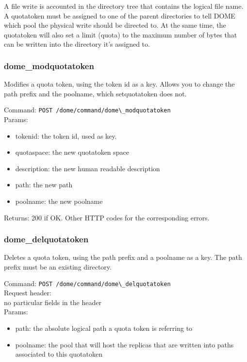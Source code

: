 \documentclass[a4paper,10pt]{scrreprt}
\begin{document}
A file write is accounted in the directory tree that contains the logical file name. A quotatoken must be assigned to one of the parent directories to tell DOME which pool the physical write should be directed to.
At the same time, the quotatoken will also set a limit (quota) to the maximum number of bytes that can be written into the directory it's assigned to.

\subsubsection{dome\_modquotatoken}
Modifies a quota token, using the token id as a key. Allows you to change the path prefix and the poolname, which setquotatoken does not.

Command:
\lstinline"POST /dome/command/dome\_modquotatoken"\\

Params:
\begin{itemize}
 \item tokenid: the token id, used as key.
 \item quotaspace: the new quotatoken space
 \item description: the new human readable description
 \item path: the new path
 \item poolname: the new poolname
\end{itemize}

Returns: 200 if OK. Other HTTP codes for the corresponding errors.

\subsubsection{dome\_delquotatoken}
Deletes a quota token, using the path prefix and a poolname as a key. The path prefix must be an existing directory.

Command:
\lstinline"POST /dome/command/dome\_delquotatoken"\\

Request header:\\
no particular fields in the header\\

Params:\\
\begin{itemize}
 \item path: the absolute logical path a quota token is referring to
 \item poolname: the pool that will host the replicas that are written into paths associated to this quotatoken
\end{itemize}
\end{document}
